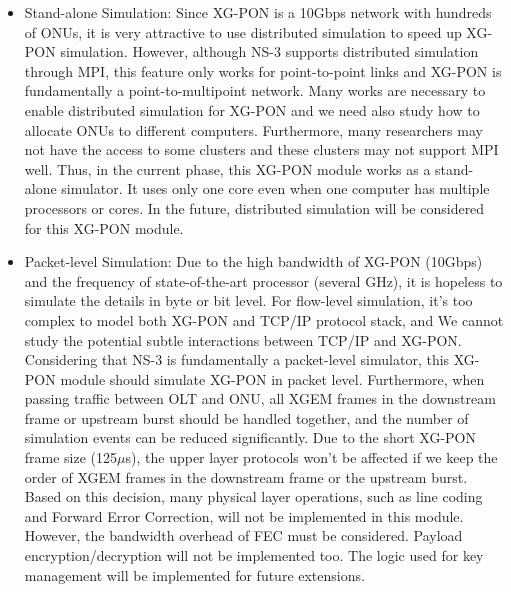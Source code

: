 \begin{itemize}

\item{Stand-alone Simulation:} Since XG-PON is a 10Gbps network with hundreds of
ONUs, it is very attractive to use distributed simulation to speed
up XG-PON simulation. However, although NS-3 supports distributed
simulation through MPI, this feature only works for point-to-point
links and XG-PON is fundamentally a point-to-multipoint network.
Many works are necessary to enable distributed simulation for
XG-PON and we need also study how to allocate ONUs to different
computers. Furthermore, many researchers may not have the access
to some clusters and these clusters may not support MPI well.
Thus, in the current phase, this XG-PON module works as a
stand-alone simulator. It uses only one core even when one
computer has multiple processors or cores. In the future,
distributed simulation will be considered for this XG-PON module.

\item{Packet-level Simulation:} Due to the high bandwidth of XG-PON (10Gbps) and the frequency of
state-of-the-art processor (several GHz), it is hopeless to
simulate the details in byte or bit level. For flow-level
simulation, it's too complex to model both XG-PON and TCP/IP
protocol stack, and We cannot study the potential subtle
interactions between TCP/IP and XG-PON. Considering that NS-3 is
fundamentally a packet-level simulator, this XG-PON module should
simulate XG-PON in packet level. Furthermore, when passing traffic
between OLT and ONU, all XGEM frames in the downstream frame or
upstream burst should be handled together, and the number of
simulation events can be reduced significantly. Due to the short
XG-PON frame size (125$\mu$s), the upper layer protocols won't be
affected if we keep the order of XGEM frames in the downstream
frame or the upstream burst. Based on this decision, many physical
layer operations, such as line coding and Forward Error
Correction, will not be implemented in this module. However, the
bandwidth overhead of FEC must be considered. Payload
encryption/decryption will not be implemented too. The logic used
for key management will be implemented for future extensions.



\end{itemize}
